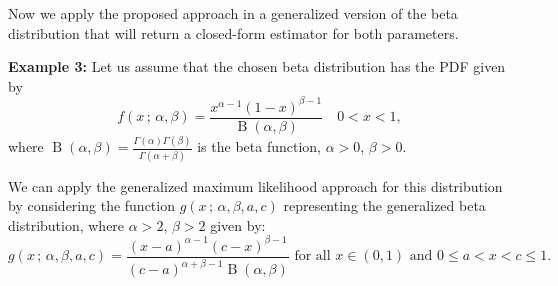\documentclass[10pt,a4paper,onecolumn]{article} %
\newcommand{\f}{\on}
\newcommand{\on}{\operatorname}
\begin{document}
Now we apply the proposed approach in a generalized version of the beta distribution that will return a closed-form estimator for both parameters.
\vspace{0.3cm}

\noindent\textbf{Example 3:} Let us assume that the chosen beta distribution has the PDF given by
\begin{equation}\label{fdpbeta}
f(x\,;\,\alpha,\beta)=\frac{x^{\alpha-1}(1-x)^{\beta-1}}{\f{B}(\alpha,\beta)} \quad  0 <x<1,
\end{equation}
where $\f{B}(\alpha,\beta)=\frac{\Gamma(\alpha)\Gamma(\beta)}{\Gamma(\alpha+\beta)}$ is the beta function, $\alpha>0$, $\beta>0$.

We can apply the generalized maximum likelihood approach for this distribution by considering the function $g(x\,;\,\alpha,\beta,a,c)$ representing the generalized beta distribution,  where $\alpha>2$, $\beta>2$ given by:
\begin{equation*}g(x\,;\,\alpha,\beta,a,c)=\frac{\left(x-a\right)^{\alpha-1}\left(c-x\right)^{\beta-1}}{(c-a)^{\alpha+\beta-1}\f{B}(\alpha,\beta)}\mbox{ for all } x\in (0,1)\mbox{ and }0\leq a<x<c\leq 1.
\end{equation*}
\end{document}
